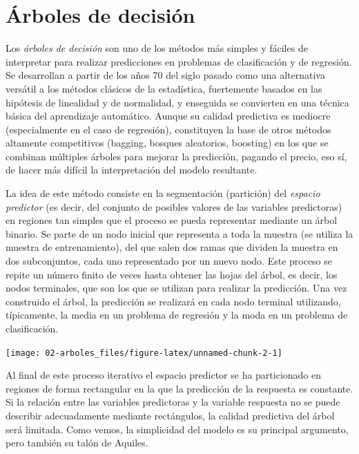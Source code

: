 \documentclass[
  spanish,
]{book}
\theoremstyle{break}
\theoremstyle{definition}
\theoremstyle{definition}
\theoremstyle{definition}
\theoremstyle{definition}
\theoremstyle{remark}
\begin{document}
\hypertarget{trees}{%
\chapter{Árboles de decisión}\label{trees}}

Los \emph{árboles de decisión} son uno de los métodos más simples y fáciles de interpretar para realizar predicciones en problemas de clasificación y de regresión.
Se desarrollan a partir de los años 70 del siglo pasado como una alternativa versátil a los métodos clásicos de la estadística, fuertemente basados en las hipótesis de linealidad y de normalidad, y enseguida se convierten en una técnica básica del aprendizaje automático.
Aunque su calidad predictiva es mediocre (especialmente en el caso de regresión), constituyen la base de otros métodos altamente competitivos (bagging, bosques aleatorios, boosting) en los que se combinan múltiples árboles para mejorar la predicción, pagando el precio, eso sí, de hacer más difícil la interpretación del modelo resultante.

La idea de este método consiste en la segmentación (partición) del \emph{espacio predictor} (es decir, del conjunto de posibles valores de las variables predictoras) en regiones tan simples que el proceso se pueda representar mediante un árbol binario.
Se parte de un nodo inicial que representa a toda la muestra (se utiliza la muestra de entrenamiento), del que salen dos ramas que dividen la muestra en dos subconjuntos, cada uno representado por un nuevo nodo.
Este proceso se repite un número finito de veces hasta obtener las hojas del árbol, es decir, los nodos terminales, que son los que se utilizan para realizar la predicción.
Una vez construido el árbol, la predicción se realizará en cada nodo terminal utilizando, típicamente, la media en un problema de regresión y la moda en un problema de clasificación.

\begin{center}\texttt{[image: 02-arboles\_files/figure-latex/unnamed-chunk-2-1]} \end{center}

Al final de este proceso iterativo el espacio predictor se ha particionado en regiones de forma rectangular en la que la predicción de la respuesta es constante.
Si la relación entre las variables predictoras y la variable respuesta no se puede describir adecuadamente mediante rectángulos, la calidad predictiva del árbol será limitada.
Como vemos, la simplicidad del modelo es su principal argumento, pero también su talón de Aquiles.
\end{document}
